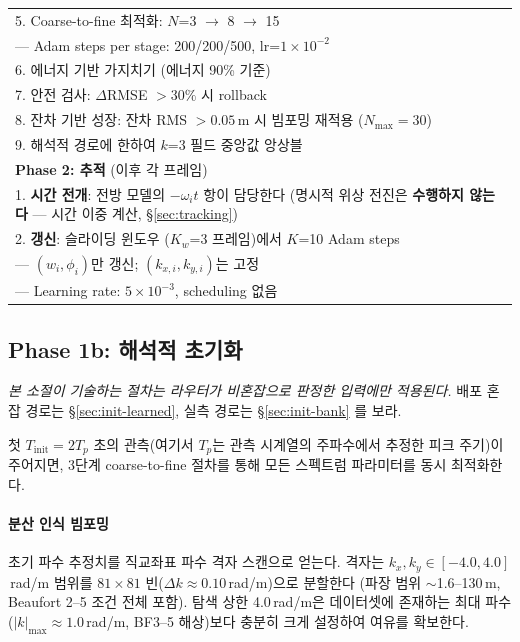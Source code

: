 \documentclass[11pt]{report}
\numberwithin{equation}{chapter}
\numberwithin{figure}{chapter}
\numberwithin{table}{chapter}
\begin{document}
\begin{table}[htbp]
\begin{tabular}{p{}}
5. Coarse-to-fine 최적화: $N$=3 $\to$ 8 $\to$ 15 \\
\quad --- Adam steps per stage: 200/200/500, lr=$1\times 10^{-2}$ \\
6. 에너지 기반 가지치기 (에너지 90\% 기준) \\
7. 안전 검사: $\Delta$RMSE $> 30\%$ 시 rollback \\
8. 잔차 기반 성장: 잔차 RMS $> 0.05$\,m 시 빔포밍 재적용 ($N_{\max} = 30$) \\
9. 해석적 경로에 한하여 $k$=3 필드 중앙값 앙상블 \\
\midrule
\textbf{Phase 2: 추적} (이후 각 프레임) \\
\midrule
1. \textbf{시간 전개}: 전방 모델의 $-\omega_i t$ 항이 담당한다
    (명시적 위상 전진은 \textbf{수행하지 않는다} --- 시간 이중 계산, §\ref{sec:tracking}) \\
2. \textbf{갱신}: 슬라이딩 윈도우 ($K_w$=3 프레임)에서 $K$=10 Adam steps \\
\quad --- $(w_i, \phi_i)$만 갱신; $(k_{x,i}, k_{y,i})$는 고정 \\
\quad --- Learning rate: $5\times 10^{-3}$, scheduling 없음 \\
\bottomrule
\end{tabular}
\end{table}

\subsection{Phase 1b: 해석적 초기화}
\label{sec:init}

\emph{본 소절이 기술하는 절차는 라우터가 비혼잡으로 판정한 입력에만 적용된다.}
배포 혼잡 경로는 §\ref{sec:init-learned}, 실측 경로는 §\ref{sec:init-bank} 를 보라.

첫 $T_{\text{init}} = 2 T_p$ 초의 관측(여기서 $T_p$는 관측 시계열의 주파수에서
추정한 피크 주기)이 주어지면, 3단계 coarse-to-fine 절차를 통해
모든 스펙트럼 파라미터를 동시 최적화한다.

\paragraph{분산 인식 빔포밍}
초기 파수 추정치를 직교좌표 파수 격자 스캔으로 얻는다.
격자는 $k_x, k_y \in [-4.0, 4.0]$\,rad/m 범위를
$81 \times 81$ 빈($\Delta k \approx 0.10$\,rad/m)으로 분할한다
(파장 범위 $\sim$1.6--130\,m, Beaufort 2--5 조건 전체 포함).
탐색 상한 4.0\,rad/m은 데이터셋에 존재하는 최대 파수
($|k|_{\max} \approx 1.0$\,rad/m, BF3--5 해상)보다 충분히 크게 설정하여
여유를 확보한다.
\end{document}

